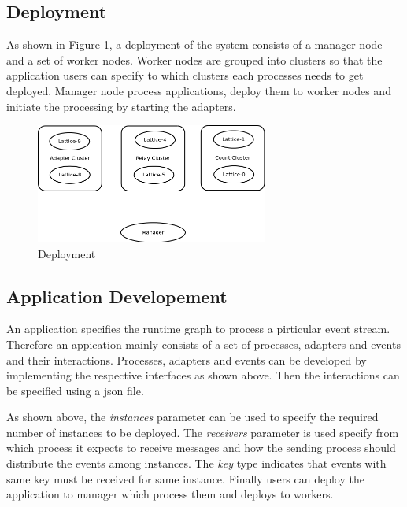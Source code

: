  \subsection{Deployment}

As shown in Figure \ref{deployment}, a deployment of the system consists of a manager node and a set of worker nodes. Worker nodes are grouped into clusters so that the application users can specify to which clusters each processes needs to get deployed. Manager node process applications, deploy them to worker nodes and initiate the processing by starting the adapters.

\begin{figure}[!t]
        \centering
        \includegraphics[width=3.0in]{deployment.png}
        \caption{Deployment}
        \label{deployment}
\end{figure}

\subsection{Application Developement}

An application specifies the runtime graph to process a pirticular event stream. Therefore an appication mainly consists of a set of processes, adapters and events and their interactions. Processes, adapters and events can be developed by implementing the respective interfaces as shown above. Then the interactions can be specified using a json file. 



As shown above, the \textit{instances} parameter can be used to specify the required number of instances to be deployed. The \textit{receivers} parameter is used specify from which process it expects to receive messages and how the sending process should distribute the events among instances. The \textit{key} type indicates that events with same key must be received for same instance. Finally users can deploy the application to manager which process them and deploys to workers.






 
